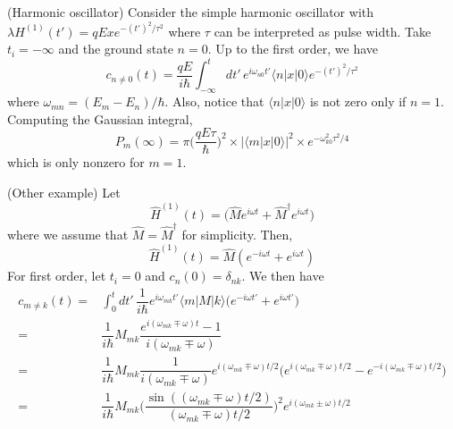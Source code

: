 \vspace{2ex}
\begin{ex}
(Harmonic oscillator) Consider the simple harmonic oscillator with $\lambda H^{(1)}(t')=qExe^{-(t')^2/\tau ^2}$ where $\tau$ can be interpreted as pulse width. Take $t_{i}=-\infty $ and the ground state $n=0$. Up to the first order, we have
\[c_{n \ne 0}(t)=\dfrac{qE}{i\hbar }\int ^{t}_{-\infty }dt'\,e^{i\omega _{n0}t'}\langle n|x|0\rangle e^{-(t')^2/\tau ^2}\]
where $\omega _{mn}=(E_{m}-E_{n})/\hbar $. Also, notice that $\langle n|x|0\rangle $ is not zero only if $n=1$. Computing the Gaussian integral,
\[P_{m}(\infty )=\pi \Big(\dfrac{qE\tau }{\hbar }\Big)^2\times |\langle m|x|0\rangle |^2\times e^{-\omega ^2_{k0}\tau ^2/4}\]
which is only nonzero for $m=1$.
\end{ex}
\vspace{2ex}
\begin{ex}
(Other example) Let
\[\hat{H}^{(1)}(t)=\Big(\hat{M}e^{i\omega t}+\hat{M}^{\dagger }e^{i\omega t}\Big)\]
where we assume that $\hat{M}=\hat{M}^{\dagger }$ for simplicity. Then,
\[\hat{H}^{(1)}(t)=\hat{M}(e^{-i\omega t}+e^{i\omega t})\]
For first order, let $t_{i}=0$ and $c_{n}(0)=\delta _{nk}$. We then have
\[\begin{align*}
c_{m\ne k}(t)=&\int ^{t}_{0}dt'\,\dfrac{1}{i\hbar }e^{i\omega _{mk}t'}\langle m|M|k\rangle \Big(e^{-i\omega t'}+e^{i\omega t'}\Big)\\
=&\dfrac{1}{i\hbar }M_{mk}\dfrac{e^{i(\omega _{mk}\mp\omega )t}-1}{i(\omega _{mk}\mp \omega )}\\
=&\dfrac{1}{i\hbar }M_{mk}\dfrac{1}{i(\omega _{mk}\mp \omega )}e^{i(\omega _{mk}\mp \omega )t/2}\Big(e^{i(\omega _{mk}\mp \omega )t/2}-e^{-i(\omega _{mk}\mp \omega )t/2}\Big)\\
=&\dfrac{1}{i\hbar }M_{mk}\Big(\dfrac{\sin ((\omega _{mk}\mp \omega )t/2)}{(\omega _{mk}\mp \omega )t/2}\Big)^2e^{i(\omega _{mk}\pm \omega )t/2}
\end{align*}\]

\end{ex}
\vspace{2ex}

